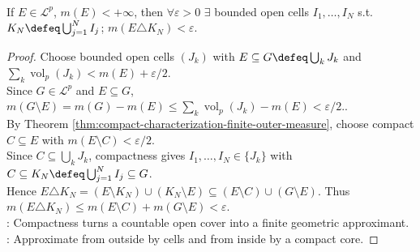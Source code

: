 \begin{theorem} \label{thm:finite-cell-symmetric-difference-approximation} \\
If $E\in\mathcal{L}^p$, $m(E)<+\infty$, then $\forall \varepsilon>0$ $\exists$ bounded open cells $I_1,\ldots,I_N$ s.t. $K_N\defeq\bigcup_{j=1}^{N}I_j$; $m(E\triangle K_N)<\varepsilon$.
\begin{proof}
Choose bounded open cells $(J_k)$ with $E\subseteq G\defeq\bigcup_kJ_k$ and $\sum_k\operatorname{vol}_p(J_k)<m(E)+\varepsilon/2$.\\
Since $G\in\mathcal{L}^p$ and $E\subseteq G$, $m(G\setminus E)=m(G)-m(E)\leq\sum_k\operatorname{vol}_p(J_k)-m(E)<\varepsilon/2$..\\
By Theorem \ref{thm:compact-characterization-finite-outer-measure}, choose compact $C\subseteq E$ with $m(E\setminus C)<\varepsilon/2$.\\
Since $C\subseteq\bigcup_kJ_k$, compactness gives $I_1,\ldots,I_N\in\{J_k\}$ with $C\subseteq K_N\defeq\bigcup_{j=1}^{N}I_j\subseteq G$.\\
Hence $E\triangle K_N=(E\setminus K_N)\cup(K_N\setminus E) \subseteq (E\setminus C)\cup(G\setminus E)$. Thus $m(E\triangle K_N)\leq m(E\setminus C)+m(G\setminus E)<\varepsilon$.\\
: Compactness turns a countable open cover into a finite geometric approximant.\\
: Approximate from outside by cells and from inside by a compact core.
\end{proof}
\end{theorem}

